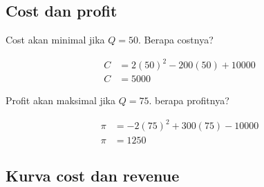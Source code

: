 \documentclass[
  letterpaper,
  DIV=11,
  numbers=noendperiod]{scrartcl}
\begin{document}
\subsection{Cost dan profit}\label{cost-dan-profit}

Cost akan minimal jika \(Q=50\). Berapa costnya?

\[
\begin{align}
C&=2(50)^2-200(50)+10000 \\
C&=5000
\end{align}
\]

Profit akan maksimal jika \(Q=75\). berapa profitnya?

\[
\begin{align}
\pi&=-2(75)^2+300(75)-10000 \\
\pi&=1250
\end{align}
\]

\subsection{Kurva cost dan revenue}\label{kurva-cost-dan-revenue}
\end{document}
